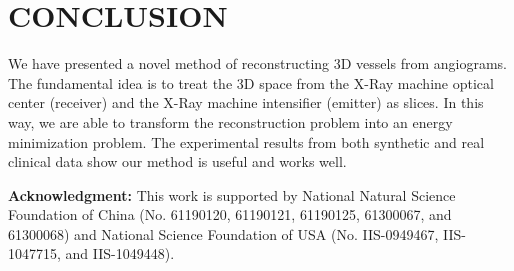 \documentclass[10pt, conference, compsocconf]{IEEEtran}
\begin{document}
\section{CONCLUSION}

We have presented a novel method of reconstructing 3D vessels from
angiograms. The fundamental idea is to treat the 3D space from the X-Ray
machine optical center (receiver) and the X-Ray machine intensifier
(emitter) as slices. In this way, we are able to transform the
reconstruction problem into an energy minimization problem. The experimental
results from both synthetic and real clinical data show our method is useful
and works well.

\textbf{Acknowledgment:} This work is supported by National Natural
Science Foundation of China (No. 61190120, 61190121, 61190125,
61300067, and 61300068) and National Science Foundation of USA (No.
IIS-0949467, IIS-1047715, and IIS-1049448).







%


\end{document}
